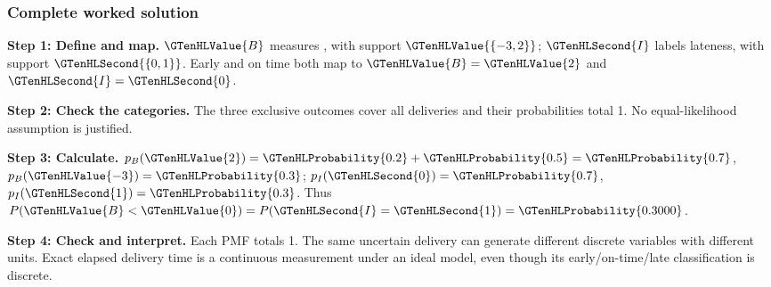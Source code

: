 \subsubsection*{Complete worked solution}
\par\noindent\begin{minipage}{\linewidth}
\textbf{Step 1: Define and map.} $\GTenHLValue{B}$ measures , with support $\GTenHLValue{\{-3,2\}}$; $\GTenHLSecond{I}$ labels lateness, with support $\GTenHLSecond{\{0,1\}}$. Early and on time both map to $\GTenHLValue{B}=\GTenHLValue{2}$ and $\GTenHLSecond{I}=\GTenHLSecond{0}$.
\end{minipage}\par\medskip
\par\noindent\begin{minipage}{\linewidth}
\textbf{Step 2: Check the categories.} The three exclusive outcomes cover all deliveries and their probabilities total 1. No equal-likelihood assumption is justified.
\end{minipage}\par\medskip
\par\noindent\begin{minipage}{\linewidth}
\textbf{Step 3: Calculate.} $p_B(\GTenHLValue{2})=\GTenHLProbability{0.2}+\GTenHLProbability{0.5}=\GTenHLProbability{0.7}$, $p_B(\GTenHLValue{-3})=\GTenHLProbability{0.3}$; $p_I(\GTenHLSecond{0})=\GTenHLProbability{0.7}$, $p_I(\GTenHLSecond{1})=\GTenHLProbability{0.3}$. Thus $P(\GTenHLValue{B}<\GTenHLValue{0})=P(\GTenHLSecond{I}=\GTenHLSecond{1})=\GTenHLProbability{0.3000}$.
\end{minipage}\par\medskip
\par\noindent\begin{minipage}{\linewidth}
\textbf{Step 4: Check and interpret.} Each PMF totals 1. The same uncertain delivery can generate different discrete variables with different units. Exact elapsed delivery time is a continuous measurement under an ideal model, even though its early/on-time/late classification is discrete.
\end{minipage}\par\medskip
